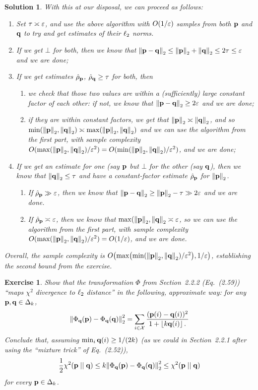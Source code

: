 \documentclass[biber,plain]{nowfnt} %
\newtheorem{question}{Exercise}[chapter]
\newtheorem{solution}{Solution}[chapter]
\begin{document}
\begin{solution}
With this at our disposal, we can proceed as follows: 
\begin{enumerate}
	\item Set $\tau \asymp \dst$, and use the above algorithm with $\bigO{1/\dst}$ samples from both $\p$ and $\q$ to try and get estimates of their $\lp[2]$ norms. 
	\item If we get $\bot$ for both, then we know that $\normtwo{\p-\q} \leq \normtwo{\p}+\normtwo{\q} \leq 2\tau \leq \dst$ and we are done;
	\item If we get estimates $\hat{\rho}_{\p}$, $\hat{\rho}_{\q}\geq \tau$ for both, then 
		\begin{enumerate}
			\item we check that those two values are within a (sufficiently) large constant factor of each other: if not, we know that $\normtwo{\p-\q} \geq 2\dst$ and we are done;
			\item if they are within constant factors, we get that $\normtwo{\p}\asymp \normtwo{\q}$, and so $\min(\normtwo{\p},\normtwo{\q})\asymp \max(\normtwo{\p},\normtwo{\q})$ and we can use the algorithm from the first part, with sample complexity $O(\max\Paren{\normtwo{\p},\normtwo{\q}}/\dst^2)=O(\min\Paren{\normtwo{\p},\normtwo{\q}}/\dst^2)$, and we are done;
		\end{enumerate}
	\item If we get an estimate for one (say $\p$ but $\bot$ for the other (say $\q$), then we know that $\normtwo{\q} \leq \tau$ and have a constant-factor estimate $\hat{\rho}_{\p}$ for $\normtwo{\p}$. 
		\begin{enumerate}
				\item If $\hat{\rho}_{\p} \gg \dst$, then we know that $\normtwo{\p-\q} \geq \normtwo{\p}-\tau \gg 2\dst$ and we are done.
				\item If $\hat{\rho}_{\p} \asymp \dst$, then we know that $\max(\normtwo{\p},\normtwo{\q} \asymp \dst$, so we can use the algorithm from the first part, with sample complexity $O(\max\Paren{\normtwo{\p},\normtwo{\q}}/\dst^2) = O(1/\dst)$, and we are done.
		\end{enumerate}
\end{enumerate}
Overall, the sample complexity is $\bigO{\max\Paren{\min\Paren{\normtwo{\p},\normtwo{\q}}/\dst^2}, 1/\dst}$, establishing the second bound from the exercise.
\end{solution}
\begin{question}\label{ex:l2:reduction:chisquare}
Show that the transformation $\Phi$ from Section~2.2.2 (Eq.~(2.59)) ``maps $\chi^2$ divergence to $\lp[2]$ distance'' in the following, approximate way: for any $\p,\q\in\distribs{\ab}$, 
\[
	\normtwo{\Phi_\q(\p)-\Phi_\q(\q)}^2 = \sum_{i\in\domain}\frac{(\p(i)-\q(i))^2}{1+\flr{\ab\q(i)}\,.}
\]
Conclude that, assuming $\min_i \q(i) \geq 1/(2\ab)$ (as we could in Section~2.2.1 after using the ``mixture trick'' of Eq.~(2.52)), 
\[
	\frac{1}{2}\chisquare{\p}{\q}\leq \ab\normtwo{\Phi_\q(\p)-\Phi_\q(\q)}^2 \leq \chisquare{\p}{\q}
\]
for every $\p\in\distribs{\ab}$.
\end{question}
\end{document}
